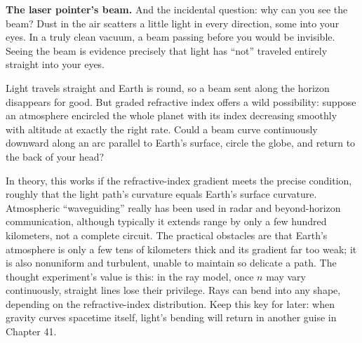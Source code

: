 \textbf{The laser pointer's beam.} And the incidental question: why can you see the beam? Dust in the air scatters a little light in every direction, some into your eyes. In a truly clean vacuum, a beam passing before you would be invisible. Seeing the beam is evidence precisely that light has ``not'' traveled entirely straight into your eyes.


\begin{thought}
Light travels straight and Earth is round, so a beam sent along the horizon disappears for good. But graded refractive index offers a wild possibility: suppose an atmosphere encircled the whole planet with its index decreasing smoothly with altitude at exactly the right rate. Could a beam curve continuously downward along an arc parallel to Earth's surface, circle the globe, and return to the back of your head?

In theory, this works if the refractive-index gradient meets the precise condition, roughly that the light path's curvature equals Earth's surface curvature. Atmospheric ``waveguiding'' really has been used in radar and beyond-horizon communication, although typically it extends range by only a few hundred kilometers, not a complete circuit. The practical obstacles are that Earth's atmosphere is only a few tens of kilometers thick and its gradient far too weak; it is also nonuniform and turbulent, unable to maintain so delicate a path. The thought experiment's value is this: in the ray model, once \(n\) may vary continuously, straight lines lose their privilege. Rays can bend into any shape, depending on the refractive-index distribution. Keep this key for later: when gravity curves spacetime itself, light's bending will return in another guise in Chapter 41.
\end{thought}

